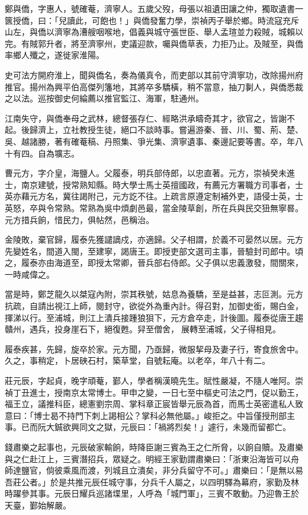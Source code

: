 \begin{pinyinscope}
鄭與僑，字惠人，號確菴，濟寧人。五歲父歿，母張以祖遺田讓之仲，獨取遺書一篋授僑，曰：「兒讀此，可飽也！」與僑發奮力學，崇禎丙子舉於鄉。時流寇充斥山左，與僑以濟寧為漕艘咽喉地，倡義與城守張世臣、舉人孟瑄並力殺賊，城賴以完。有賊郭升者，將至濟寧州，吏議迎款，囑與僑草表，力拒乃止。及賊至，與僑率鄉人殲之，遂徙家淮陽。

史可法方開府淮上，聞與僑名，奏為儀真令，而吏部以其前守濟寧功，改除揚州府推官。揚州為興平伯高傑列籓地，其將卒多驕橫，稍不當意，抽刀剚人，與僑悉裁之以法。巡按御史何綸薦以推官監江、海軍，駐通州。

江南失守，與僑奉母之武林，總督張存仁、經略洪承疇奇其才，欲官之，皆謝不起。後歸濟上，立社教授生徒，絕口不談時事。嘗遍游秦、晉、川、蜀、荊、楚、吳、越諸勝，著有確菴稿、丹照集、爭光集、濟寧遺事、秦邊記要等書。卒，年八十有四。自為壙志。

曹元方，字介皇，海鹽人。父履泰，明兵部侍郎，以忠直著。元方，崇禎癸未進士，南京建號，授常熟知縣。時大學士馬士英擅國政，有薦元方署職方司事者，士英亦藉元方名，冀往謁附己，元方訖不往。上疏言原遵定制補外吏，語侵士英，士英怒，卒與令常熟。常熟為吳中煩劇邑最，當金陵草創，所在兵與民交狃無寧晷。元方措兵餉，惜民力，俱帖然，邑稱治。

金陵敗，棄官歸，履泰先獲譴謫戍，亦適歸。父子相謂，於義不可晏然以居。元方先變姓名，間道入閩，至建寧，謁唐王。即授吏部文選司主事，晉驗封司郎中。頃之，履泰亦由海道至，即授太常卿，晉兵部右侍郎。父子俱以忠義激發，間關來，一時咸偉之。

當是時，鄭芝龍久以桀寇內附，崇其秩號，姑息為養驕，至是益甚，志叵測。元方抗疏，自請出視江上師，閱封守，欲從外為重內計。得召對，加御史銜，賜白金，揮涕以行。至浦城，則江上潰兵接踵狼狽下，元方倉卒走，計後圖。履泰從唐王趨贛州，遇兵，投身崖石下，絕復甦。舁至僧舍，展轉至浦城，父子得相見。

履泰疾甚，先歸，旋卒於家。元方聞，乃亟歸，微服挈母及妻子行，寄食旅舍中。久之，事稍定，卜居硤石村，築草堂，自號耘庵。以老卒，年八十有二。

莊元辰，字起貞，晚字頑菴，鄞人，學者稱漢曉先生。賦性嚴凝，不隨人唯阿。崇禎丁丑進士，授南京太常博士。甲申之變，一日七至中樞史可法之門，促以勤王，福王立，議推科臣，總憲劉宗周、掌科章正宸皆舉元辰為首，而馬士英密遣私人致意曰：「博士曷不持門下刺上謁相公？掌科必無他屬。」峻拒之。中旨僅授刑部主事。已而阮大鋮欲興同文之獄，元辰曰：「禍將烈矣！」遽行，未幾而留都亡。

錢肅樂之起事也，元辰破家輸餉，時降臣謝三賓為王之仁所脅，以餉自贖。及肅樂與之仁赴江上，三賓潛招兵，眾疑之。明經王家勤謂肅樂曰：「浙東沿海皆可以舟師達鹽官，倘彼乘風而渡，列城且立潰矣，非分兵留守不可。」肅樂曰：「是無以易吾莊公者。」於是共推元辰任城守事，分兵千人屬之，以四明驛為幕府，家勤及林時躍參其事。元辰日耀兵巡諸堞里，人呼為「城門軍」，三賓不敢動。乃迎魯王於天臺，鄞始解嚴。


\end{pinyinscope}
